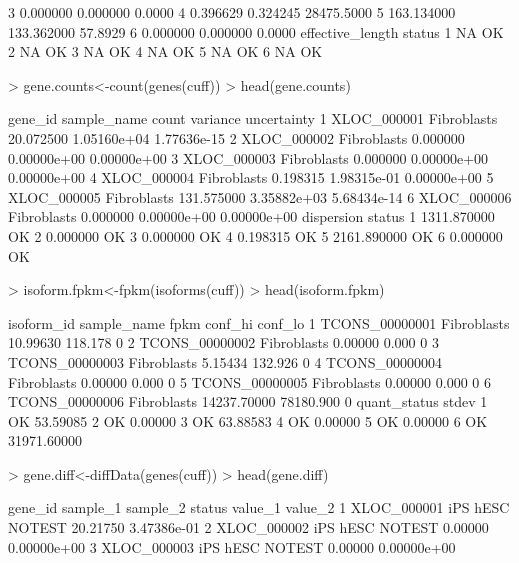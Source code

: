 \documentclass[10pt]{article}
\begin{document}
\begin{Schunk}
\begin{Soutput}
3              0.000000              0.000000     0.0000
4              0.396629              0.324245 28475.5000
5            163.134000            133.362000    57.8929
6              0.000000              0.000000     0.0000
  effective_length status
1               NA     OK
2               NA     OK
3               NA     OK
4               NA     OK
5               NA     OK
6               NA     OK
\end{Soutput}
\begin{Sinput}
> gene.counts<-count(genes(cuff))
> head(gene.counts)
\end{Sinput}
\begin{Soutput}
      gene_id sample_name      count    variance uncertainty
1 XLOC_000001 Fibroblasts  20.072500 1.05160e+04 1.77636e-15
2 XLOC_000002 Fibroblasts   0.000000 0.00000e+00 0.00000e+00
3 XLOC_000003 Fibroblasts   0.000000 0.00000e+00 0.00000e+00
4 XLOC_000004 Fibroblasts   0.198315 1.98315e-01 0.00000e+00
5 XLOC_000005 Fibroblasts 131.575000 3.35882e+03 5.68434e-14
6 XLOC_000006 Fibroblasts   0.000000 0.00000e+00 0.00000e+00
   dispersion status
1 1311.870000     OK
2    0.000000     OK
3    0.000000     OK
4    0.198315     OK
5 2161.890000     OK
6    0.000000     OK
\end{Soutput}
\begin{Sinput}
> isoform.fpkm<-fpkm(isoforms(cuff))
> head(isoform.fpkm)
\end{Sinput}
\begin{Soutput}
      isoform_id sample_name        fpkm   conf_hi conf_lo
1 TCONS_00000001 Fibroblasts    10.99630   118.178       0
2 TCONS_00000002 Fibroblasts     0.00000     0.000       0
3 TCONS_00000003 Fibroblasts     5.15434   132.926       0
4 TCONS_00000004 Fibroblasts     0.00000     0.000       0
5 TCONS_00000005 Fibroblasts     0.00000     0.000       0
6 TCONS_00000006 Fibroblasts 14237.70000 78180.900       0
  quant_status       stdev
1           OK    53.59085
2           OK     0.00000
3           OK    63.88583
4           OK     0.00000
5           OK     0.00000
6           OK 31971.60000
\end{Soutput}
\begin{Sinput}
> gene.diff<-diffData(genes(cuff))
> head(gene.diff)
\end{Sinput}
\begin{Soutput}
      gene_id sample_1 sample_2 status   value_1     value_2
1 XLOC_000001      iPS     hESC NOTEST  20.21750 3.47386e-01
2 XLOC_000002      iPS     hESC NOTEST   0.00000 0.00000e+00
3 XLOC_000003      iPS     hESC NOTEST   0.00000 0.00000e+00

\end{Soutput}
\end{Schunk}
\end{document}
